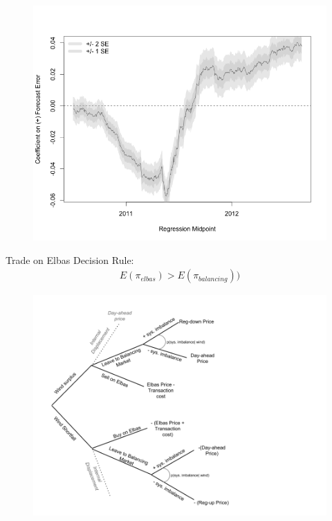 \documentclass{beamer}
\begin{document}
\begin{frame}[plain]
	\begin{figure}
	\includegraphics[width=1\textwidth]{figures/WindowRegression.png}
	\end{figure}
\end{frame}


\begin{frame}[plain]
	Trade on Elbas Decision Rule:
		\begin{align}
		 E(\pi_{elbas}) > E(\pi_{balancing})) 
	\label{glm_eqn}
		\end{align}
\end{frame}

\begin{frame}[plain]
	\begin{figure}
	\includegraphics[width=1\textwidth]{figures/DecisionTree.png}
	\end{figure}
\end{frame}
\end{document}
